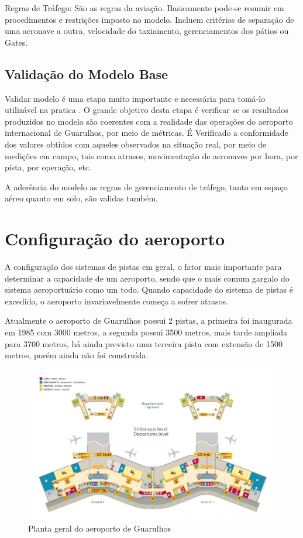 \documentclass[12pt]{article}
\begin{document}
  Regras de Tráfego: São as regras da aviação. Basicamente pode-se resumir
  em procedimentos e restrições imposto no modelo. Incluem critérios de 
  separação de uma aeronave a outra, velocidade do taxiamento, gerenciamentos
  dos pátios ou Gates.
  
  
  \subsection{Validação do Modelo Base}
  Validar modelo é uma etapa muito importante e necessária para tomá-lo 
  utilizável na pratica . O grande objetivo desta etapa é verificar se os
  resultados produzidos no modelo são coerentes com a realidade das operações
  do aeroporto internacional de Guarulhos, por meio de métricas. 
  É Verificado a conformidade dos valores obtidos com aqueles observados na
  situação real, por meio de medições em campo, tais como atrasos,
  movimentação de aeronaves por hora, por pista, por operação, etc.
  
  A aderência do modelo as regras de gerenciamento de tráfego, tanto em espaço
  aéreo quanto em solo, são validas também.
  
  
  \section{Configuração do aeroporto}

  A configuração dos sistemas de pistas em geral, o fator mais importante
  para determinar a capacidade de um aeroporto, sendo que o mais comum 
  gargalo do sistema aeroportuário como um todo. Quando capacidade do 
  sistema de pistas é excedido, o aeroporto invariavelmente começa a 
  sofrer atrasos.
  
  Atualmente o aeroporto de Guarulhos possui 2 pistas, a primeira foi 
  inaugurada em 1985 com  3000 metros, a segunda possui 3500 metros, 
  mais tarde ampliada para 3700 metros, há ainda previsto uma terceira
  pista com extensão de 1500 metros, porém ainda não foi construída. 
  
  \begin{figure}[h!]
    \centering
    \includegraphics[width=.9\textwidth]{aeroporto.png}
    \caption{Planta geral do aeroporto de Guarulhos}
    \label{fig:aeropoto}
  \end{figure}
\end{document}
